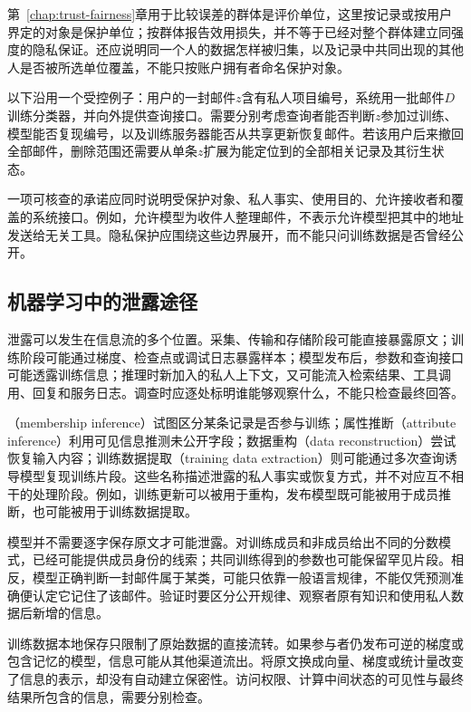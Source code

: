 第~\ref{chap:trust-fairness}章用于比较误差的群体是评价单位，这里按记录或按用户界定的对象是保护单位；按群体报告效用损失，并不等于已经对整个群体建立同强度的隐私保证。还应说明同一个人的数据怎样被归集，以及记录中共同出现的其他人是否被所选单位覆盖，不能只按账户拥有者命名保护对象。

以下沿用一个受控例子：用户的一封邮件$z$含有私人项目编号，系统用一批邮件$D$训练分类器，并向外提供查询接口。需要分别考虑查询者能否判断$z$参加过训练、模型能否复现编号，以及训练服务器能否从共享更新恢复邮件。若该用户后来撤回全部邮件，删除范围还需要从单条$z$扩展为能定位到的全部相关记录及其衍生状态。

一项可核查的承诺应同时说明受保护对象、私人事实、使用目的、允许接收者和覆盖的系统接口。例如，允许模型为收件人整理邮件，不表示允许模型把其中的地址发送给无关工具。隐私保护应围绕这些边界展开，而不能只问训练数据是否曾经公开。

\subsection{机器学习中的泄露途径}
\label{sec:privacy-leakage-channels}

泄露可以发生在信息流的多个位置。采集、传输和存储阶段可能直接暴露原文；训练阶段可能通过梯度、检查点或调试日志暴露样本；模型发布后，参数和查询接口可能透露训练信息；推理时新加入的私人上下文，又可能流入检索结果、工具调用、回复和服务日志。调查时应逐处标明谁能够观察什么，不能只检查最终回答。

（membership inference）试图区分某条记录是否参与训练；属性推断（attribute inference）利用可见信息推测未公开字段；数据重构（data reconstruction）尝试恢复输入内容；训练数据提取（training data extraction）则可能通过多次查询诱导模型复现训练片段。这些名称描述泄露的私人事实或恢复方式，并不对应互不相干的处理阶段。例如，训练更新可以被用于重构，发布模型既可能被用于成员推断，也可能被用于训练数据提取。

模型并不需要逐字保存原文才可能泄露。对训练成员和非成员给出不同的分数模式，已经可能提供成员身份的线索；共同训练得到的参数也可能保留罕见片段。相反，模型正确判断一封邮件属于某类，可能只依靠一般语言规律，不能仅凭预测准确便认定它记住了该邮件。验证时要区分公开规律、观察者原有知识和使用私人数据后新增的信息。

训练数据本地保存只限制了原始数据的直接流转。如果参与者仍发布可逆的梯度或包含记忆的模型，信息可能从其他渠道流出。将原文换成向量、梯度或统计量改变了信息的表示，却没有自动建立保密性。访问权限、计算中间状态的可见性与最终结果所包含的信息，需要分别检查。

